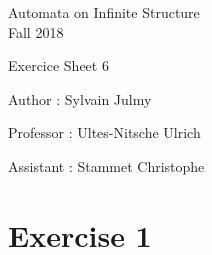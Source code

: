 \documentclass[a4paper,11pt]{report}
\author{Sylvain Julmy}
\date{\today}
\begin{document}
\begin{center}
  \Large{
    Automata on Infinite Structure\\
    Fall 2018
  }
  
  \noindent\makebox[\linewidth]{\rule{\linewidth}{0.4pt}}
  Exercice Sheet 6

  \vspace*{1.4cm}

  Author : Sylvain Julmy
  \noindent\makebox[\linewidth]{\rule{\linewidth}{0.4pt}}

  \begin{flushleft}
    Professor : Ultes-Nitsche Ulrich
    
    Assistant : Stammet Christophe
  \end{flushleft}

  \noindent\makebox[\linewidth]{\rule{\textwidth}{1pt}}
\end{center}

\section*{Exercise 1}
\end{document}
